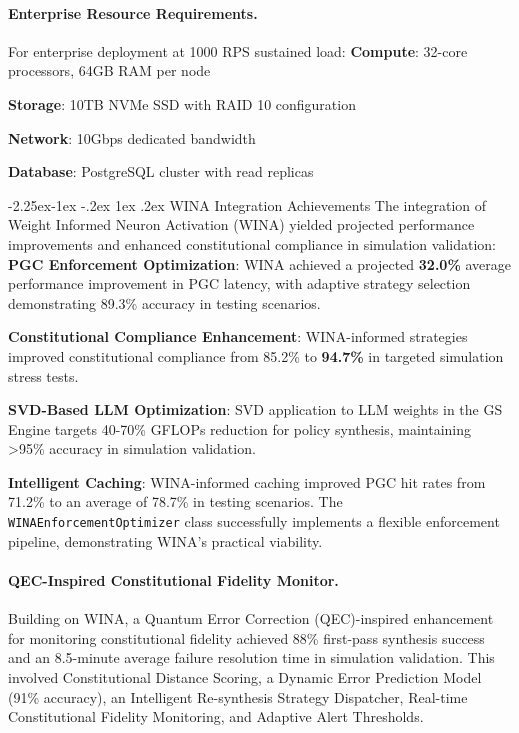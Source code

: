 \documentclass[manuscript,screen,9pt]{acmart}
\makeatletter
\renewcommand\subsection{\@startsection{subsection}{2}{\z@}%
  {-2.25ex\@plus -1ex \@minus -.2ex}%
  {1ex \@plus .2ex}%
  {\normalfont\large\bfseries}}
\makeatother
\begin{document}
\paragraph{Enterprise Resource Requirements.}
For enterprise deployment at 1000 RPS sustained load:
\noindent\textbf{Compute}: 32-core processors, 64GB RAM per node

\noindent\textbf{Storage}: 10TB NVMe SSD with RAID 10 configuration

\noindent\textbf{Network}: 10Gbps dedicated bandwidth

\noindent\textbf{Database}: PostgreSQL cluster with read replicas

\subsection{WINA Integration Achievements}
\label{subsec:wina_integration_achievements}
The integration of Weight Informed Neuron Activation (WINA) yielded projected performance improvements and enhanced constitutional compliance in simulation validation:
\noindent\textbf{PGC Enforcement Optimization}: WINA achieved a projected \textbf{32.0\%} average performance improvement in PGC latency, with adaptive strategy selection demonstrating 89.3\% accuracy in testing scenarios.

\noindent\textbf{Constitutional Compliance Enhancement}: WINA-informed strategies improved constitutional compliance from 85.2\% to \textbf{94.7\%} in targeted simulation stress tests.

\noindent\textbf{SVD-Based LLM Optimization}: SVD application to LLM weights in the GS Engine targets 40-70\% GFLOPs reduction for policy synthesis, maintaining >95\% accuracy in simulation validation.

\noindent\textbf{Intelligent Caching}: WINA-informed caching improved PGC hit rates from 71.2\% to an average of 78.7\% in testing scenarios.
The \texttt{WINAEnforcementOptimizer} class successfully implements a flexible enforcement pipeline, demonstrating WINA's practical viability.

\paragraph{QEC-Inspired Constitutional Fidelity Monitor.} Building on WINA, a Quantum Error Correction (QEC)-inspired enhancement for monitoring constitutional fidelity achieved 88\% first-pass synthesis success and an 8.5-minute average failure resolution time in simulation validation. This involved Constitutional Distance Scoring, a Dynamic Error Prediction Model (91\% accuracy), an Intelligent Re-synthesis Strategy Dispatcher, Real-time Constitutional Fidelity Monitoring, and Adaptive Alert Thresholds.
\end{document}
